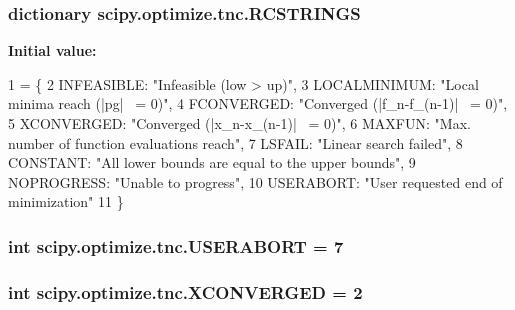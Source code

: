 \subsubsection[{R\+C\+S\+T\+R\+I\+N\+G\+S}]{\setlength{\rightskip}{0pt plus 5cm}dictionary scipy.\+optimize.\+tnc.\+R\+C\+S\+T\+R\+I\+N\+G\+S}\label{namespacescipy_1_1optimize_1_1tnc_aab91a376900ced001d3a219d07630129}
{\bfseries Initial value\+:}
\begin{DoxyCode}
1 = \{
2         INFEASIBLE: \textcolor{stringliteral}{"Infeasible (low > up)"},
3         LOCALMINIMUM: \textcolor{stringliteral}{"Local minima reach (|pg| ~= 0)"},
4         FCONVERGED: \textcolor{stringliteral}{"Converged (|f\_n-f\_(n-1)| ~= 0)"},
5         XCONVERGED: \textcolor{stringliteral}{"Converged (|x\_n-x\_(n-1)| ~= 0)"},
6         MAXFUN: \textcolor{stringliteral}{"Max. number of function evaluations reach"},
7         LSFAIL: \textcolor{stringliteral}{"Linear search failed"},
8         CONSTANT: \textcolor{stringliteral}{"All lower bounds are equal to the upper bounds"},
9         NOPROGRESS: \textcolor{stringliteral}{"Unable to progress"},
10         USERABORT: \textcolor{stringliteral}{"User requested end of minimization"}
11 \}
\end{DoxyCode}
\hypertarget{namespacescipy_1_1optimize_1_1tnc_a18ec84591f568aca91ba828abdb39451}{}
\subsubsection[{U\+S\+E\+R\+A\+B\+O\+R\+T}]{\setlength{\rightskip}{0pt plus 5cm}int scipy.\+optimize.\+tnc.\+U\+S\+E\+R\+A\+B\+O\+R\+T = 7}\label{namespacescipy_1_1optimize_1_1tnc_a18ec84591f568aca91ba828abdb39451}
\hypertarget{namespacescipy_1_1optimize_1_1tnc_ac1951f5afda694640198c98a0c7c9b99}{}
\subsubsection[{X\+C\+O\+N\+V\+E\+R\+G\+E\+D}]{\setlength{\rightskip}{0pt plus 5cm}int scipy.\+optimize.\+tnc.\+X\+C\+O\+N\+V\+E\+R\+G\+E\+D = 2}\label{namespacescipy_1_1optimize_1_1tnc_ac1951f5afda694640198c98a0c7c9b99}
